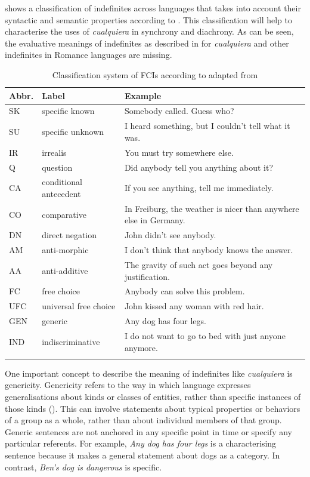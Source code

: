 { shows a classification of indefinites across languages that takes into account their syntactic and semantic properties according to \citet{Haspelmath1997}. This classification will help to characterise the uses of \textit{cualquiera} in synchrony and diachrony.
As can be seen, the evaluative meanings of indefinites as described in  for \textit{cualquiera} and other indefinites in Romance languages are missing.} 


\begin{table}
\begin{tabularx}{\textwidth}{llQ}
\lsptoprule
\textbf{Abbr.} & \textbf{Label} & \textbf{Example} \\
\midrule
SK & specific known & Somebody called. Guess who? \\
SU & specific unknown & I heard something, but I couldn’t tell what it was. \\
IR & irrealis & You must try somewhere else. \\
Q & question & Did anybody tell you anything about it? \\
CA & conditional antecedent & If you see anything, tell me immediately. \\
CO & comparative & In Freiburg, the weather is nicer than anywhere else in Germany. \\
DN & direct negation & John didn’t see anybody. \\
AM & anti-morphic & I don’t think that anybody knows the answer. \\
AA & anti-additive & The gravity of such act goes beyond any justification. \\
FC & free choice & Anybody can solve this problem. \\
UFC & universal free choice & John kissed any woman with red hair. \\
GEN & generic & Any dog has four legs. \\
IND & indiscriminative & I do not want to go to bed with just anyone anymore. \\
\lspbottomrule
\end{tabularx}
\caption {Classification system of FCIs according to \citet{Haspelmath1997} adapted from \citet{Aloni2010}}
\label{table:functions_map}
\end{table}

{One important concept to describe the meaning of indefinites like \textit{cualquiera} is genericity. Genericity refers to the way in which language expresses generalisations about kinds or classes of entities, rather than specific instances of those kinds (\cite{Carlson1977, Krifka1995}). This can involve statements about typical properties or behaviors of a group as a whole, rather than about individual members of that group. Generic sentences are not anchored in any specific point in time or specify any particular referents. For example, \textit{Any dog has four legs} is a characterising sentence because it makes a general statement about dogs as a category. In contrast, \textit{Ben's dog is dangerous} is specific.} 

